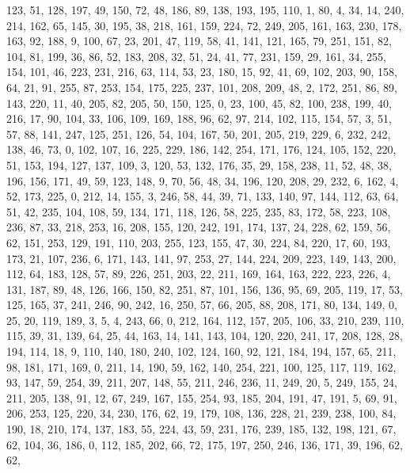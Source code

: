 \begin{DoxyCode}
       123, 51, 128, 197, 49, 150, 72, 48, 186, 89, 138, 193, 195, 110, 1, 80, 4, 34, 14, 240, 214, 162, 65, 145, 30,
       195, 38, 218, 161, 159, 224, 72, 249, 205, 161, 163, 230, 178, 163, 92, 188, 9, 100, 67, 23, 201, 47, 119,
       58, 41, 141, 121, 165, 79, 251, 151, 82, 104, 81, 199, 36, 86, 52, 183, 208, 32, 51, 24, 41, 77, 231, 159,
       29, 161, 34, 255, 154, 101, 46, 223, 231, 216, 63, 114, 53, 23, 180, 15, 92, 41, 69, 102, 203, 90, 158, 64,
       21, 91, 255, 87, 253, 154, 175, 225, 237, 101, 208, 209, 48, 2, 172, 251, 86, 89, 143, 220, 11, 40, 205, 82,
       205, 50, 150, 125, 0, 23, 100, 45, 82, 100, 238, 199, 40, 216, 17, 90, 104, 33, 106, 109, 169, 188, 96, 62,
       97, 214, 102, 115, 154, 57, 3, 51, 57, 88, 141, 247, 125, 251, 126, 54, 104, 167, 50, 201, 205, 219, 229, 6,
       232, 242, 138, 46, 73, 0, 102, 107, 16, 225, 229, 186, 142, 254, 171, 176, 124, 105, 152, 220, 51, 153,
       194, 127, 137, 109, 3, 120, 53, 132, 176, 35, 29, 158, 238, 11, 52, 48, 38, 196, 156, 171, 49, 59, 123, 148, 9,
       70, 56, 48, 34, 196, 120, 208, 29, 232, 6, 162, 4, 52, 173, 225, 0, 212, 14, 155, 3, 246, 58, 44, 39, 71,
       133, 140, 97, 144, 112, 63, 64, 51, 42, 235, 104, 108, 59, 134, 171, 118, 126, 58, 225, 235, 83, 172, 58,
       223, 108, 236, 87, 33, 218, 253, 16, 208, 155, 120, 242, 191, 174, 137, 24, 228, 62, 159, 56, 62, 151, 253,
       129, 191, 110, 203, 255, 123, 155, 47, 30, 224, 84, 220, 17, 60, 193, 173, 21, 107, 236, 6, 171, 143, 141, 97,
       253, 27, 144, 224, 209, 223, 149, 143, 200, 112, 64, 183, 128, 57, 89, 226, 251, 203, 22, 211, 169, 164,
       163, 222, 223, 226, 4, 131, 187, 89, 48, 126, 166, 150, 82, 251, 87, 101, 156, 136, 95, 69, 205, 119, 17, 53,
       125, 165, 37, 241, 246, 90, 242, 16, 250, 57, 66, 205, 88, 208, 171, 80, 134, 149, 0, 25, 20, 119, 189, 3, 5,
       4, 243, 66, 0, 212, 164, 112, 157, 205, 106, 33, 210, 239, 110, 115, 39, 31, 139, 64, 25, 44, 163, 14, 141,
       143, 104, 120, 220, 241, 17, 208, 128, 28, 194, 114, 18, 9, 110, 140, 180, 240, 102, 124, 160, 92, 121,
       184, 194, 157, 65, 211, 98, 181, 171, 169, 0, 211, 14, 190, 59, 162, 140, 254, 221, 100, 125, 117, 119, 162,
       93, 147, 59, 254, 39, 211, 207, 148, 55, 211, 246, 236, 11, 249, 20, 5, 249, 155, 24, 211, 205, 138, 91, 12,
       67, 249, 167, 155, 254, 93, 185, 204, 191, 47, 191, 5, 69, 91, 206, 253, 125, 220, 34, 230, 176, 62, 19, 179,
       108, 136, 228, 21, 239, 238, 100, 84, 190, 18, 210, 174, 137, 183, 55, 224, 43, 59, 231, 176, 239, 185,
       132, 198, 121, 67, 62, 104, 36, 186, 0, 112, 185, 202, 66, 72, 175, 197, 250, 246, 136, 171, 39, 196, 62, 62,

\end{DoxyCode}
